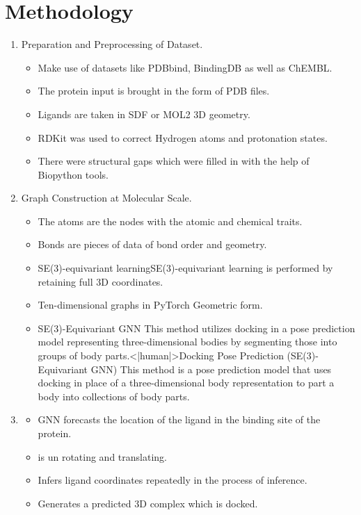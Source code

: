 \documentclass[12pt,a4]{report}
\begin{document}
\section{Methodology}
\hspace*{0.3in}
\begin{enumerate}
    \item Preparation and Preprocessing of Dataset.
    \begin{itemize}
        \item Make use of datasets like PDBbind, BindingDB as well as ChEMBL.
        \item The protein input is brought in the form of PDB files.
        \item Ligands are taken in SDF or MOL2 3D geometry.
        \item RDKit was used to correct Hydrogen atoms and protonation states.
        \item There were structural gaps which were filled in with the help of Biopython tools.
    \end{itemize}

    \item Graph Construction at Molecular Scale.
    \begin{itemize}
        \item The atoms are the nodes with the atomic and chemical traits.
        \item Bonds are pieces of data of bond order and geometry.
        \item SE(3)-equivariant learningSE(3)-equivariant learning is performed by retaining full 3D coordinates.
        \item Ten-dimensional graphs in PyTorch Geometric form.
        \item SE(3)-Equivariant GNN This method utilizes docking in a pose prediction model representing three-dimensional bodies by segmenting those into groups of body parts.<|human|>Docking Pose Prediction (SE(3)-Equivariant GNN) This method is a pose prediction model that uses docking in place of a three-dimensional body representation to part a body into collections of body parts.
    \end{itemize}

    \item 
    \begin{itemize}
        \item GNN forecasts the location of the ligand in the binding site of the protein.
        \item is un rotating and translating.
        \item Infers ligand coordinates repeatedly in the process of inference.
        \item Generates a predicted 3D complex which is docked.
    \end{itemize}


\end{enumerate}
\end{document}
